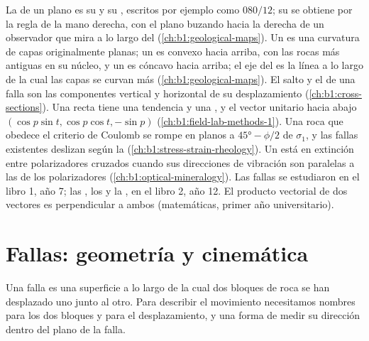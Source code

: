 \begin{recall}
La  de un plano es su  y su , escritos por ejemplo como
$080/12$; su  se obtiene por la regla de la mano derecha, con el plano buzando hacia la derecha de un observador que
mira a lo largo del  (\cref{ch:b1:geological-maps}). Un  es una curvatura de capas originalmente planas; un
 es convexo hacia arriba, con las rocas más antiguas en su núcleo, y un  es cóncavo hacia arriba; el eje
del  es la línea a lo largo de la cual las capas se curvan más (\cref{ch:b1:geological-maps}). El salto y el  de una falla son las componentes vertical y horizontal de su desplazamiento (\cref{ch:b1:cross-sections}). Una
recta tiene una tendencia y una , y el vector unitario hacia abajo $(\cos p\sin t, \cos p\cos t, -\sin p)$
(\cref{ch:b1:field-lab-methods-1}). Una roca que obedece el criterio de Coulomb se rompe en planos a $\ang{45} - \phi/2$ de
$\sigma_1$, y las fallas existentes deslizan según la  (\cref{ch:b1:stress-strain-rheology}). Un  está
en extinción entre polarizadores cruzados cuando sus direcciones de vibración son paralelas a las de los polarizadores
(\cref{ch:b1:optical-mineralogy}). Las fallas se estudiaron en el libro 1, año 7; las , los  y
la , en el libro 2, año 12. El producto vectorial de dos vectores es perpendicular a ambos (matemáticas, primer año
universitario).
\end{recall}

\section{Fallas: geometría y cinemática}\label{sec:b1:faults-folds-fabrics:faults}

Una falla es una superficie a lo largo de la cual dos bloques de roca se han desplazado uno junto al otro. Para describir el
movimiento necesitamos nombres para los dos bloques y para el desplazamiento, y una forma de medir su dirección dentro del
plano de la falla.

